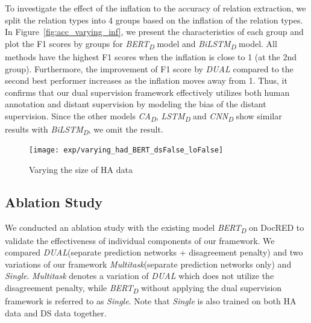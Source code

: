 \documentclass[11pt]{article}
\newcommand{\minisection}[1]{\vspace{0.03in}{\bf \noindent #1.} }
\renewcommand{\figurename}{Figure}
\newcommand{\dcnn}{\emph{CNN\textsubscript{D}}\xspace}
\newcommand{\dlstm}{\emph{LSTM\textsubscript{D}}\xspace}
\newcommand{\dca}{\emph{CA\textsubscript{D}}\xspace}
\newcommand{\dbilstm}{\emph{BiLSTM\textsubscript{D}}\xspace}
\newcommand{\dbert}{\emph{BERT\textsubscript{D}}\xspace}
\newcommand{\dual}{\emph{DUAL}\xspace}
\newcommand{\multitask}{\emph{Multitask}\xspace}
\newcommand{\single}{\emph{Single}\xspace}
\begin{document}
\minisection{Inflation vs. accuracy}
To investigate the effect of the inflation to the accuracy of relation extraction,
we split the relation types into 4 groups based on the inflation of the relation types.
In \figurename~\ref{fig:acc_varying_inf}, we present the characteristics of each group and plot the F1 scores by groups for \dbert model and \dbilstm model.
All methods have the highest F1 scores when the inflation is close to 1 (at the 2nd group).
Furthermore, the improvement of F1 score by \dual compared to the second best performer increases as the inflation moves away from 1.
Thus, it confirms that our dual supervision framework effectively utilizes both human annotation and distant supervision by modeling the bias of the distant supervision.
Since the other models \dca, \dlstm and \dcnn show similar results with \dbilstm, we omit the result.










\begin{wrapfigure}{R}{0.4\textwidth}
\vspace{-0.16in}
	\texttt{[image: exp/varying\_had\_BERT\_dsFalse\_loFalse]}
\vspace{-0.13in}
	\caption{Varying the size of HA data \label{fig:acc_by_had}}
	\vspace{-0.13in}
\end{wrapfigure}
\subsection{Ablation Study}
We conducted an ablation study with the existing model \dbert on DocRED to validate the effectiveness of individual components of our framework.
We compared \dual (separate prediction networks + disagreement penalty) and two variations of our framework \multitask (separate prediction networks only) and \single.
\multitask denotes a variation of \dual which does not utilize the disagreement penalty,
while  \dbert without applying the dual supervision framework  is referred to as \single.
Note that \single is also trained on both HA data and DS data together.
\end{document}
